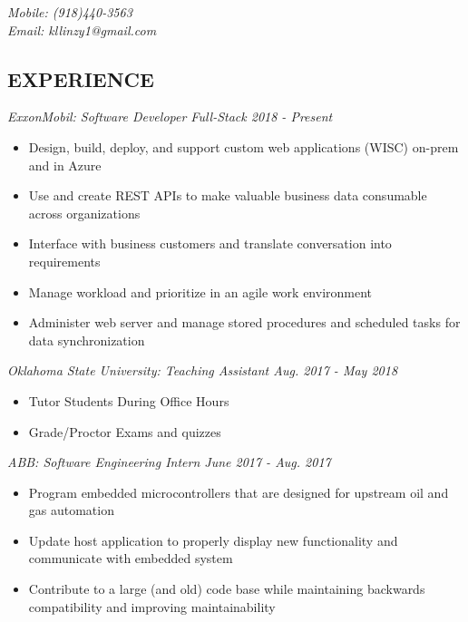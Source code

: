 \documentclass[line,margin]{res}
\begin{document}
{
\hfill { \sl Mobile: (918)440-3563} \\
\null\hfill { \sl Email: kllinzy1@gmail.com} \\
}
\address{23550 Northgate Crossing Blvd.}
\address{Spring Texas, 77373, APT. 153}

\begin{resume}

  \section{EXPERIENCE} {\sl ExxonMobil: Software Developer Full-Stack
          \hfill 2018 - \sl Present}
                 \begin{itemize}  \itemsep -2pt %
                 \item Design, build, deploy, and support custom web applications (WISC) on-prem
                   and in Azure 
                 \item Use and create REST APIs to make valuable business data consumable across
                   organizations
                 \item Interface with business customers and translate conversation into
                   requirements 
                \item Manage workload and prioritize in an agile work environment 
                \item Administer web server and manage stored procedures and scheduled
                  tasks for data synchronization
                \end{itemize}

                 {\sl Oklahoma State University: Teaching Assistant \hfill Aug. 2017 - May 2018}
                 \begin{itemize}  \itemsep -2pt %
                 \item Tutor Students During Office Hours 
                 \item Grade/Proctor Exams and quizzes
                 \end{itemize} 


                 {\sl ABB: Software Engineering Intern  \hfill June 2017 - Aug. 2017 }
                 \begin{itemize}  \itemsep -2pt %
                 \item Program embedded microcontrollers that are designed for upstream
                   oil and gas automation 
                 \item Update host application to properly display new functionality and
                   communicate with embedded system
                 \item Contribute to a large (and old) code base while maintaining
                   backwards compatibility and improving maintainability
                 \end{itemize} 


\end{resume}
\end{document}
